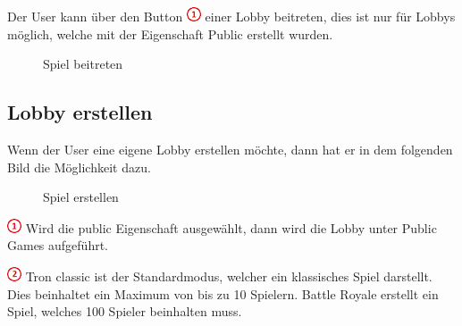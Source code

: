\documentclass[11pt,ngerman]{article}
\begin{document}
    Der User kann über den Button \includegraphics{figures/1.png} einer Lobby beitreten, dies ist nur für Lobbys möglich, welche mit der Eigenschaft Public erstellt wurden.
    
    \begin{figure}[H]
    	\centering
    	\caption{Spiel beitreten}
    	\label{fig:Spiel_Beitreten}
    \end{figure}
    
    \subsection{Lobby erstellen}
    
    Wenn der User eine eigene Lobby erstellen möchte, dann hat er in dem folgenden Bild die Möglichkeit dazu.
    
	\begin{figure}[H]
		\centering
		\caption{Spiel erstellen}
		\label{fig:Spiel_Erstellen}
	\end{figure}
    
    \includegraphics{figures/1.png} Wird die public Eigenschaft ausgewählt, dann wird die Lobby unter Public Games aufgeführt. 
    
    \includegraphics{figures/2.png} Tron classic ist der Standardmodus, welcher ein klassisches Spiel darstellt. Dies beinhaltet ein Maximum von bis zu 10 Spielern. Battle Royale erstellt ein Spiel, welches 100 Spieler beinhalten muss.
    
\end{document}
